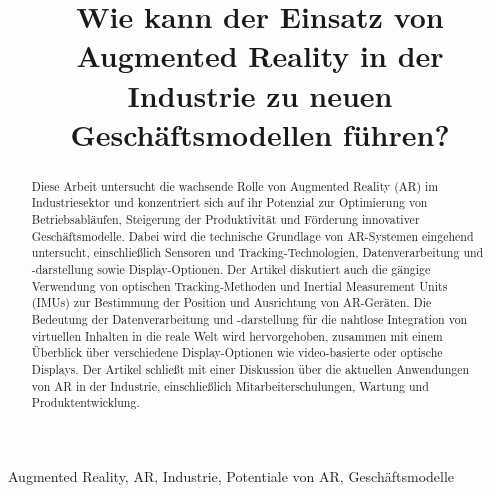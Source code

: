 \documentclass[conference]{IEEEtran}
\title{ Wie kann der Einsatz von Augmented Reality in der Industrie zu neuen Geschäftsmodellen führen?}
\author{
	\IEEEauthorblockN{Simon Kuhn}
	\IEEEauthorblockA{
		\textit{Technische Hochschule Ingolstadt} \\
		16. Juni 2023 %
	}
}
\begin{document}
\maketitle
\begin{abstract}
	Diese Arbeit untersucht die wachsende Rolle von Augmented Reality (AR) im Industriesektor
	und konzentriert sich auf ihr Potenzial zur Optimierung von Betriebsabläufen,
	Steigerung der Produktivität und Förderung innovativer Geschäftsmodelle.
	Dabei wird die technische Grundlage von AR-Systemen eingehend untersucht,
	einschließlich Sensoren und Tracking-Technologien, Datenverarbeitung und
	-darstellung sowie Display-Optionen. Der Artikel diskutiert auch die gängige
	Verwendung von optischen Tracking-Methoden und Inertial Measurement Units (IMUs)
	zur Bestimmung der Position und Ausrichtung von AR-Geräten. Die Bedeutung der
	Datenverarbeitung und -darstellung für die nahtlose Integration von virtuellen
	Inhalten in die reale Welt wird hervorgehoben, zusammen mit einem Überblick über
	verschiedene Display-Optionen wie video-basierte oder optische Displays. Der Artikel
	schließt mit einer Diskussion über die aktuellen Anwendungen von AR in der Industrie,
	einschließlich Mitarbeiterschulungen, Wartung und Produktentwicklung.
\end{abstract}
\begin{IEEEkeywords}
	Augmented Reality, AR, Industrie, Potentiale von AR, Geschäftsmodelle
\end{IEEEkeywords}






\printbibliography
\end{document}
